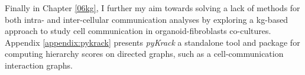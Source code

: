 Finally in Chapter \ref{06kg}, I further my aim towards solving a lack of methods for both intra- and inter-cellular communication analyses by exploring a \acrshort{kg}-based approach to study cell communication in organoid-fibroblasts co-cultures. Appendix \ref{appendix:pykrack} presents \emph{pyKrack} a standalone tool and package for computing hierarchy scores on directed graphs, such as a cell-communication interaction graphs.

